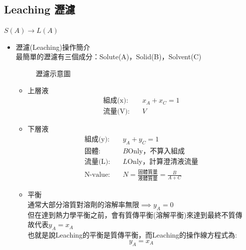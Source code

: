 \documentclass[../main.tex]{subfiles}
\begin{document}
\subsection{Leaching 瀝濾}
$S(A)\to L(A)$
\begin{itemize}
  \item 瀝濾(Leaching)操作簡介\\
  最簡單的瀝濾有三個成分：Solute(A)，Solid(B)，Solvent(C)
  \begin{figure}[H]
    \centering
    \caption{瀝濾示意圖}
  \end{figure}
  \begin{itemize}
    \item 上層液
    \begin{align}
      \text{組成(x)}:\quad & x_A + x_C = 1 \\
      \text{流量(V)}:\quad & V
    \end{align}
    \item 下層液
    \begin{align}
      \text{組成(y)}:\quad & y_A + y_C = 1 \\
      \text{固體}:\quad & B\text{Only，不算入組成} \\
      \text{流量(L)}:\quad & L\text{Only，計算澄清液流量} \\
      \text{N-value}:\quad & N = \frac{\text{固體質量}}{\text{液體質量}} = \frac{B}{A+C}
    \end{align}
    \item 平衡\\
    通常大部分溶質對溶劑的溶解率無限$\implies y_A=0$\\
    但在達到熱力學平衡之前，會有質傳平衡(溶解平衡)來達到最終不質傳\\
    故代表$y_A = x_A$\\
    也就是說Leaching的平衡是質傳平衡，而Leaching的操作線方程式為:
    \begin{equation}
      y_A = x_A
    \end{equation}

\end{itemize}
\end{itemize}
\end{document}
